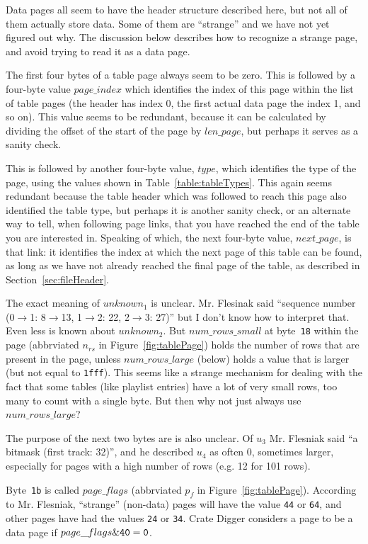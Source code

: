 \documentclass[11pt]{article}
\begin{document}
Data pages all seem to have the header structure described here, but
not all of them actually store data. Some of them are ``strange'' and
we have not yet figured out why. The discussion below describes how to
recognize a strange page, and avoid trying to read it as a data page.

The first four bytes of a table page always seem to be zero. This is
followed by a four-byte value $page\_index$ which identifies the index
of this page within the list of table pages (the header has index 0,
the first actual data page the index 1, and so on). This value seems
to be redundant, because it can be calculated by dividing the offset
of the start of the page by $len\_page$, but perhaps it serves as a
sanity check.

This is followed by another four-byte value, $type$, which identifies
the type of the page, using the values shown in
Table~\ref{table:tableTypes}. This again seems redundant because the
table header which was followed to reach this page also identified the
table type, but perhaps it is another sanity check, or an alternate
way to tell, when following page links, that you have reached the end
of the table you are interested in. Speaking of which, the next
four-byte value, $next\_page$, is that link: it identifies the index
at which the next page of this table can be found, as long as we have
not already reached the final page of the table, as described in
Section~\ref{sec:fileHeader}.

The exact meaning of $unknown_1$ is unclear. Mr. Flesinak said
``sequence number (0$\rightarrow$1: 8$\rightarrow$13, 1$\rightarrow$2:
22, 2$\rightarrow$3: 27)'' but I don't know how to interpret that.
Even less is known about $unknown_2$. But $num\_rows\_small$ at
byte~{\tt 18} within the page (abbrviated $n_{rs}$ in
Figure~\ref{fig:tablePage}) holds the number of rows that are present
in the page, unless $num\_rows\_large$ (below) holds a value that is
larger (but not equal to {\tt 1fff}). This seems like a strange
mechanism for dealing with the fact that some tables (like playlist
entries) have a lot of very small rows, too many to count with a
single byte. But then why not just always use $num\_rows\_large$?

The purpose of the next two bytes are is also unclear. Of $u_3$ Mr.
Flesniak said ``a bitmask (first track: 32)'', and he described $u_4$
as often 0, sometimes larger, especially for pages with a high number
of rows (e.g. 12 for 101 rows).

Byte~{\tt 1b} is called $page\_flags$ (abbrviated $p_f$ in
Figure~\ref{fig:tablePage}). According to Mr. Flesniak, ``strange''
(non-data) pages will have the value {\tt 44} or {\tt 64}, and other
pages have had the values {\tt 24} or {\tt 34}. Crate Digger considers
a page to be a data page if $page\_flags \& {\tt 40} = {\tt 0}$.
\end{document}
